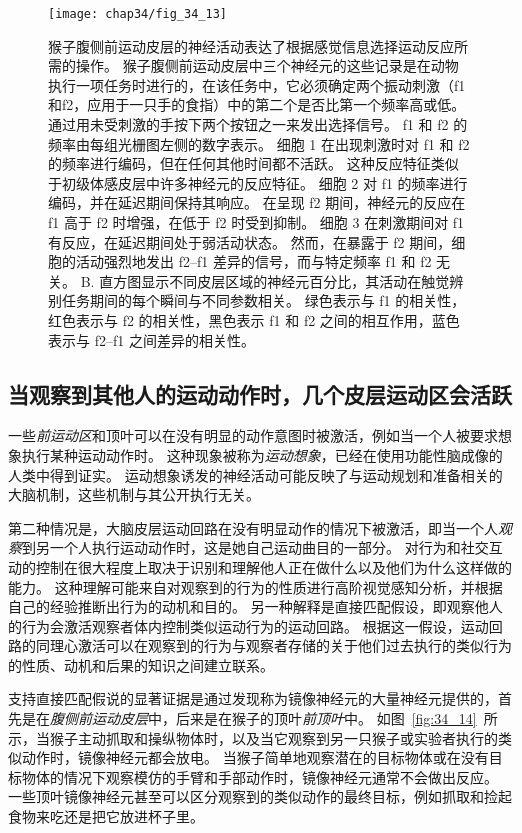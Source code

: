 \begin{figure}[htbp]
	\centering
	\texttt{[image: chap34/fig\_34\_13]}
	\caption{猴子腹侧前运动皮层的神经活动表达了根据感觉信息选择运动反应所需的操作\cite{romo2004neuronal}。
		猴子腹侧前运动皮层中三个神经元的这些记录是在动物执行一项任务时进行的，在该任务中，它必须确定两个振动刺激（f1和f2，应用于一只手的食指）中的第二个是否比第一个频率高或低。
		通过用未受刺激的手按下两个按钮之一来发出选择信号。
		f1 和 f2 的频率由每组光栅图左侧的数字表示。
		细胞 1 在出现刺激时对 f1 和 f2 的频率进行编码，但在任何其他时间都不活跃。
		这种反应特征类似于初级体感皮层中许多神经元的反应特征。
		细胞 2 对 f1 的频率进行编码，并在延迟期间保持其响应。
		在呈现 f2 期间，神经元的反应在 f1 高于 f2 时增强，在低于 f2 时受到抑制。
		细胞 3 在刺激期间对 f1 有反应，在延迟期间处于弱活动状态。
		然而，在暴露于 f2 期间，细胞的活动强烈地发出 f2–f1 差异的信号，而与特定频率 f1 和 f2 无关。
		B. 直方图显示不同皮层区域的神经元百分比，其活动在触觉辨别任务期间的每个瞬间与不同参数相关。
		绿色表示与 f1 的相关性，红色表示与 f2 的相关性，黑色表示 f1 和 f2 之间的相互作用，蓝色表示与 f2–f1 之间差异的相关性。}
	\label{fig:34_13}
\end{figure}



\subsection{当观察到其他人的运动动作时，几个皮层运动区会活跃}

一些\textit{前运动区}和顶叶可以在没有明显的动作意图时被激活，例如当一个人被要求想象执行某种运动动作时。
这种现象被称为\textit{运动想象}，已经在使用功能性脑成像的人类中得到证实。
运动想象诱发的神经活动可能反映了与运动规划和准备相关的大脑机制，这些机制与其公开执行无关。


第二种情况是，大脑皮层运动回路在没有明显动作的情况下被激活，即当一个人\textit{观察}到另一个人执行运动动作时，这是她自己运动曲目的一部分。
对行为和社交互动的控制在很大程度上取决于识别和理解他人正在做什么以及他们为什么这样做的能力。
这种理解可能来自对观察到的行为的性质进行高阶视觉感知分析，并根据自己的经验推断出行为的动机和目的。
另一种解释是直接匹配假设，即观察他人的行为会激活观察者体内控制类似运动行为的运动回路。
根据这一假设，运动回路的同理心激活可以在观察到的行为与观察者存储的关于他们过去执行的类似行为的性质、动机和后果的知识之间建立联系。


支持直接匹配假说的显著证据是通过发现称为镜像神经元的大量神经元提供的，首先是在\textit{腹侧前运动皮层}中，后来是在猴子的顶叶\textit{前顶叶}中。
如图~\ref{fig:34_14}~所示，当猴子主动抓取和操纵物体时，以及当它观察到另一只猴子或实验者执行的类似动作时，镜像神经元都会放电。
当猴子简单地观察潜在的目标物体或在没有目标物体的情况下观察模仿的手臂和手部动作时，镜像神经元通常不会做出反应。
一些顶叶镜像神经元甚至可以区分观察到的类似动作的最终目标，例如抓取和捡起食物来吃还是把它放进杯子里。


